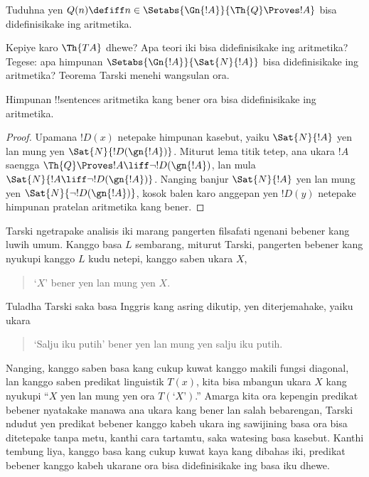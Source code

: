 \documentclass[../../../include/open-logic-section]{subfiles}
\begin{document}
\begin{prob}
Tuduhna yen $Q(n) \defiff n \in \Setabs{\Gn{!A}}{\Th{Q} \Proves !A}$
  bisa didefinisikake ing aritmetika.
\end{prob}

Kepiye karo $\Th{TA}$ dhewe? Apa teori iki bisa didefinisikake ing
aritmetika? Tegese: apa himpunan
$\Setabs{\Gn{!A}}{\Sat{N}{!A}}$ bisa didefinisikake ing
aritmetika? Teorema Tarski menehi wangsulan ora.

\begin{thm}
Himpunan !!{sentence}s aritmetika kang bener ora bisa
didefinisikake ing aritmetika.
\end{thm}

\begin{proof} 
Upamana $!D(x)$ netepake himpunan kasebut, yaiku
$\Sat{N}{!A}$ yen lan mung yen $\Sat{N}{!D(\gn{!A})}$.
Miturut lema titik tetep, ana ukara $!A$ saengga
$\Th{Q} \Proves !A \liff \lnot !D(\gn{!A})$, lan mula
$\Sat{N}{!A \liff \lnot !D(\gn{!A})}$. Nanging banjur
$\Sat{N}{!A}$ yen lan mung yen
$\Sat{N}{\lnot !D(\gn{!A})}$, kosok balen karo anggepan
yen $!D(y)$ netepake himpunan pratelan aritmetika kang bener.
\end{proof}

Tarski ngetrapake analisis iki marang pangerten filsafati ngenani
bebener kang luwih umum. Kanggo basa $L$ sembarang, miturut
Tarski, pangerten bebener kang nyukupi kanggo $L$ kudu netepi,
kanggo saben ukara $X$,
\begin{quote}
`$X$' bener yen lan mung yen $X$.
\end{quote}
Tuladha Tarski saka basa Inggris kang asring dikutip, yen
diterjemahake, yaiku ukara
\begin{quote}
`Salju iku putih' bener yen lan mung yen salju iku putih.
\end{quote}
Nanging, kanggo saben basa kang cukup kuwat kanggo
makili fungsi diagonal, lan kanggo saben predikat
linguistik $T(x)$, kita bisa mbangun ukara $X$ kang nyukupi
``$X$ yen lan mung yen ora $T(\text{`$X$'})$.''
Amarga kita ora kepengin predikat bebener nyatakake manawa ana
ukara kang bener lan salah bebarengan, Tarski ndudut yen predikat
bebener kanggo kabeh ukara ing sawijining basa ora bisa
ditetepake tanpa metu, kanthi cara tartamtu, saka watesing basa
kasebut. Kanthi tembung liya, kanggo basa kang cukup kuwat kaya kang dibahas iki, predikat bebener kanggo kabeh ukarane ora bisa didefinisikake ing basa iku dhewe.
\end{document}
